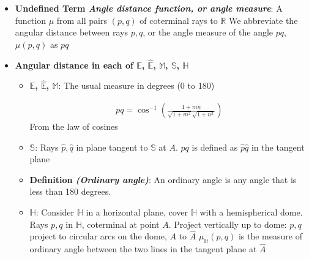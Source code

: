 \documentclass{report}
\begin{document}
\begin{itemize}
        \item \textbf{Undefined Term \textit{Angle distance function, or angle measure}}: A function $\mu$ from all pairs $(p,q) $ of coterminal rays to $\mathbb{R}$
            \bigbreak \noindent 
            We abbreviate the angular distance between rays $p,q$, or the angle measure of the angle $pq$, $\mu(p,q)$ as $pq$ 
            \bigbreak \noindent 
            \begin{figure}[ht]
                \centering
                \label{fig:undef}
            \end{figure}
            \bigbreak \noindent 
        \item \textbf{Angular distance in each of $\mathbb{E}$, $\hat{\mathbb{E}}$, $\mathbb{M}$, $\mathbb{S}$, $\mathbb{H}$}
            \begin{itemize}
                \item \textbf{$\mathbb{E}$, $\hat{\mathbb{E}}$, $\mathbb{M} $}: The usual measure in degrees (0 to 180)
                    \bigbreak \noindent 
                    \begin{figure}[ht]
                        \centering
                        \label{fig:eangle}
                    \end{figure}
                    \bigbreak \noindent 
                    \begin{align*}
                        pq = \cos^{-1}{\left(\frac{1+mn}{\sqrt{1+m^{2}}\sqrt{1+n^{2}}}\right)}
                    \end{align*}
                    From the law of cosines
                \item \textbf{$\mathbb{S}$}: 
                    \bigbreak \noindent 
                    \bigbreak \noindent 
                    Rays $\hat{p}, \hat{q}$ in plane tangent to $\mathbb{S}$ at $A$. $pq$ is defined as $\hat{p}\hat{q}$ in the tangent plane 
                \item \textbf{Definition \textit{(Ordinary angle)}}: An ordinary angle is any angle that is less than 180 degrees.
                \item $\mathbb{H}$: Consider $\mathbb{H}$ in a horizontal plane, cover $\mathbb{H}$ with a hemispherical dome. Rays $p,q$ in $ \mathbb{H}$, coterminal at point $A$. Project vertically up to dome: $p,q$ project to circular arcs on the dome, $A$ to $\hat{A}$
                    \bigbreak \noindent 
                    $\mu_{\mathbb{H}}(p,q)$ is the measure of ordinary angle between the two lines in the tangent plane at $\hat{A} $

\end{itemize}
\end{itemize}
\end{document}
